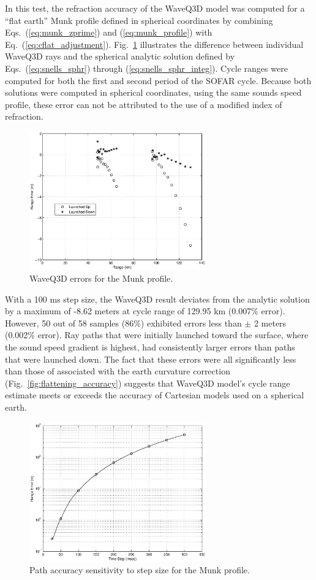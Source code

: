 \documentclass{ws-jca}
\begin{document}
In this test, the refraction accuracy of the WaveQ3D model was computed for
a ``flat earth'' Munk profile defined in spherical coordinates by combining
Eqs.~(\ref{eq:munk_zprime}) and (\ref{eq:munk_profile}) with
Eq.~(\ref{eq:cflat_adjustment}). Fig.~\ref{fig:refraction_munk_range}
illustrates the difference between individual WaveQ3D rays and the
spherical analytic solution defined by Eqs.~(\ref{eq:snells_sphr}) through
(\ref{eq:snells_sphr_integ}). Cycle ranges were computed for both the first
and second period of the SOFAR cycle. Because both solutions were computed
in spherical coordinates, using the same sounds speed profile, these error
can not be attributed to the use of a modified index of refraction.
\begin{figure}[th]
	\centerline{\includegraphics[width=3in]{refraction_munk_range.eps}} 
	\vspace*{8pt}
	\caption{WaveQ3D errors for the Munk profile. 
	\label{fig:refraction_munk_range}}
\end{figure}

With a 100 ms step size, the WaveQ3D result deviates from the analytic
solution by a maximum of -8.62 meters at cycle range of 129.95 km (0.007\%
error). However, 50 out of 58 samples (86\%) exhibited errors less than
\(\pm\) 2 meters (0.002\% error). Ray paths that were initially launched
toward the surface, where the sound speed gradient is highest, had
consistently larger errors than paths that were launched down. The fact
that these errors were all significantly less than those of associated with
the earth curvature correction (Fig.~\ref{fig:flattening_accuracy})
suggests that WaveQ3D model's cycle range estimate meets or exceeds the
accuracy of Cartesian models used on a spherical earth.
\begin{figure}[th]
	\centerline{\includegraphics[width=3in]{refraction_munk_sensitivity.eps}} 
	\vspace*{8pt}
	\caption{Path accuracy sensitivity to step size for the Munk profile. 
	\label{fig:refraction_munk_sensitivity}}
\end{figure}
\end{document}
